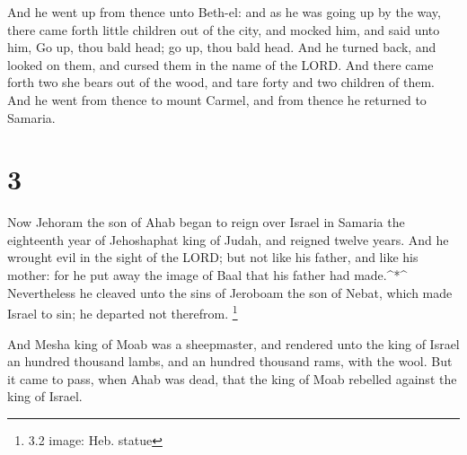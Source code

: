  And he went up from thence unto Beth-el: and as he was
going up by the way, there came forth little children out of the city,
and mocked him, and said unto him, Go up, thou bald head; go up, thou
bald head.  And he turned back, and looked on them, and
cursed them in the name of the LORD. And there came forth two she bears
out of the wood, and tare forty and two children of them. 
And he went from thence to mount Carmel, and from thence he returned to
Samaria.

\hypertarget{section-2}{%
\section{3}\label{section-2}}

 Now Jehoram the son of Ahab began to reign over Israel in
Samaria the eighteenth year of Jehoshaphat king of Judah, and reigned
twelve years.  And he wrought evil in the sight of the LORD;
but not like his father, and like his mother: for he put away the image
of Baal that his father had made.\^{}*\^{}  Nevertheless he
cleaved unto the sins of Jeroboam the son of Nebat, which made Israel to
sin; he departed not therefrom. \footnote{3.2 image: Heb. statue}

 And Mesha king of Moab was a sheepmaster, and rendered unto
the king of Israel an hundred thousand lambs, and an hundred thousand
rams, with the wool.  But it came to pass, when Ahab was
dead, that the king of Moab rebelled against the king of Israel.

